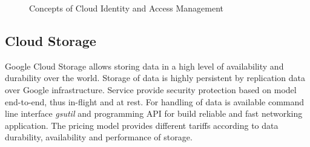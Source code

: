 \documentclass[a4paper,12pt,oneside]{report}
\begin{document}
\begin{figure}[!htbp]
    \centering
    	
	
    \caption[access]{Concepts of Cloud Identity and Access Management   \centering }
    \label{fig:iam}
\end{figure}


		\subsection{Cloud Storage}
		\label{subsub:datastore}
Google Cloud Storage allows storing data in a high level of availability and durability 
over the world. Storage of data is highly persistent by replication data over Google 
infrastructure. Service provide security protection based 
on model end-to-end, thus in-flight and at rest. For handling of data is available command 
line interface \textit{gsutil} and programming API for build 
reliable and fast networking application. The pricing model provides different tariffs 
according to data durability, availability and performance of storage.
        
\end{document}
